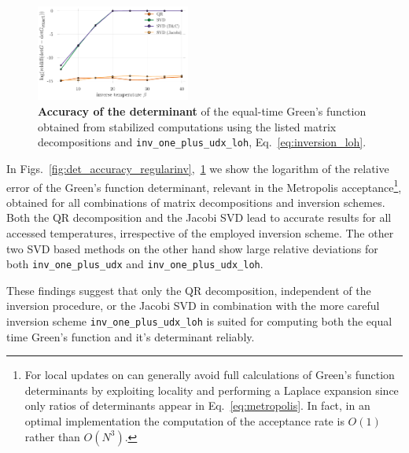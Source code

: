 \documentclass[%
 reprint,
superscriptaddress,
citeautoscript,
showpacs,
 amsmath,amssymb,
 aps,
 prb,
longbibliography,
]{revtex4-1}
\begin{document}
\begin{figure}
	\includegraphics[width=0.45\textwidth]{../notebooks/accuracy_det_svd_loh.pdf}
	\caption{\textbf{Accuracy of the determinant} of the equal-time Green's function obtained from stabilized computations using the listed matrix decompositions and \texttt{inv\_one\_plus\_udx\_loh}, Eq.~\ref{eq:inversion_loh}. \label{fig:det_accuracy_loh}}
\end{figure}

In Figs.~\ref{fig:det_accuracy_regularinv},~\ref{fig:det_accuracy_loh} we show the logarithm of the relative error of the Green's function determinant, relevant in the Metropolis acceptance\footnote{For local updates on can generally avoid full calculations of Green's function determinants by exploiting locality and performing a Laplace expansion since only ratios of determinants appear in Eq.~\ref{eq:metropolis}. In fact, in an optimal implementation the computation of the acceptance rate is $O(1)$ rather than $O(N^3)$.}, obtained for all combinations of matrix decompositions and inversion schemes. Both the QR decomposition and the Jacobi SVD lead to accurate results for all accessed temperatures, irrespective of the employed inversion scheme. The other two SVD based methods on the other hand show large relative deviations for both \texttt{inv\_one\_plus\_udx} and \texttt{inv\_one\_plus\_udx\_loh}.

These findings suggest that only the QR decomposition, independent of the inversion procedure, or the Jacobi SVD in combination with the more careful inversion scheme \texttt{inv\_one\_plus\_udx\_loh} is suited for computing both the equal time Green's function and it's determinant reliably.
\end{document}

